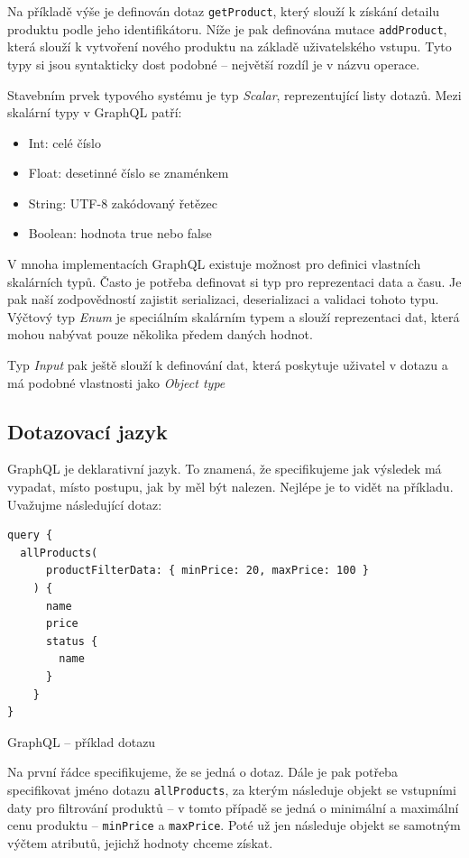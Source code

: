 \documentclass[thesis=M,czech]{FITthesis}[2019/12/23]
\begin{document}
Na příkladě výše je definován dotaz \texttt{getProduct}, který slouží k získání detailu produktu podle jeho identifikátoru. Níže je pak definována mutace \texttt{addProduct}, která slouží k vytvoření nového produktu na základě uživatelského vstupu. Tyto typy si jsou syntakticky dost podobné -- největší rozdíl je v názvu operace.

Stavebním prvek typového systému je typ \textit{Scalar}, reprezentující listy dotazů. Mezi skalární typy v GraphQL patří:
\begin{itemize}
    \item Int: celé číslo
    \item Float: desetinné číslo se znaménkem
    \item String: UTF-8 zakódovaný řetězec
    \item Boolean: hodnota true nebo false
\end{itemize}
V mnoha implementacích GraphQL existuje možnost pro definici vlastních skalárních typů. Často je potřeba definovat si typ pro reprezentaci data a času. Je pak naší zodpovědností zajistit serializaci, deserializaci a validaci tohoto typu. Výčtový typ \textit{Enum} je speciálním skalárním typem a slouží reprezentaci dat, která mohou nabývat pouze několika předem daných hodnot. 

Typ \textit{Input} pak ještě slouží k definování dat, která poskytuje uživatel v dotazu a má podobné vlastnosti jako \textit{Object type}

\subsection{Dotazovací jazyk}
GraphQL je deklarativní jazyk. To znamená, že specifikujeme jak výsledek má vypadat, místo postupu, jak by měl být nalezen. Nejlépe je to vidět na příkladu. Uvažujme následující dotaz:

\begin{listing}[H]
\begin{verbatim}
query {
  allProducts(
      productFilterData: { minPrice: 20, maxPrice: 100 }
    ) {
      name
      price
      status {
        name
      }
    }
}
\end{verbatim}
\caption{GraphQL -- příklad dotazu}
\label{lst:graphql_query_example}
\end{listing}

Na první řádce specifikujeme, že se jedná o dotaz. Dále je pak potřeba specifikovat jméno dotazu \texttt{allProducts}, za kterým následuje objekt se vstupními daty pro filtrování produktů -- v tomto případě se jedná o minimální a maximální cenu produktu -- \texttt{minPrice} a \texttt{maxPrice}. Poté už jen následuje objekt se samotným výčtem atributů, jejichž hodnoty chceme získat.
\end{document}
